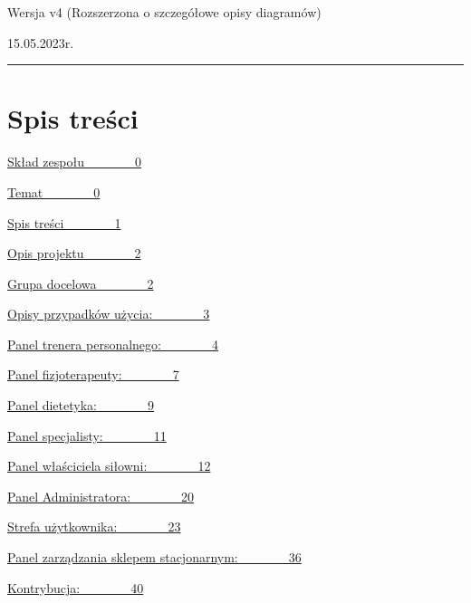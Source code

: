 \documentclass[
]{article}
\begin{document}
{}

{Wersja v4 }{(Rozszerzona o szczegółowe opisy diagramów)}

{15.05.2023r.}

\begin{center}\rule{0.5\linewidth}{0.5pt}\end{center}

{}

\hypertarget{h.qo1cey2rbfn5}{%
\section{\texorpdfstring{{Spis
treści}}{Spis treści}}\label{h.qo1cey2rbfn5}}

{\protect\hyperlink{h.ysiao1c7cfkz}{Skład zespołu~~~~~~~~0}}

{\protect\hyperlink{h.9f1f1ugzo2hd}{Temat~~~~~~~~0}}

{\protect\hyperlink{h.qo1cey2rbfn5}{Spis treści~~~~~~~~1}}

{\protect\hyperlink{h.kiazpbhrern3}{Opis projektu~~~~~~~~2}}

{\protect\hyperlink{h.no1j4fdk62eq}{Grupa docelowa~~~~~~~~2}}

{\protect\hyperlink{h.oj1ynmpx01z3}{Opisy przypadków użycia:~~~~~~~~3}}

{\protect\hyperlink{h.9umzk2qmsz4g}{Panel trenera
personalnego:~~~~~~~~4}}

{\protect\hyperlink{h.hgrtio46fsci}{Panel fizjoterapeuty:~~~~~~~~7}}

{\protect\hyperlink{h.ks35fdzbeyq3}{Panel dietetyka:~~~~~~~~9}}

{\protect\hyperlink{h.8of6ai7v3sbh}{Panel specjalisty:~~~~~~~~11}}

{\protect\hyperlink{h.2ol8m2kl4itm}{Panel właściciela
siłowni:~~~~~~~~12}}

{\protect\hyperlink{h.sjnlhh288rjz}{Panel Administratora:~~~~~~~~20}}

{\protect\hyperlink{h.53mnna977pi7}{Strefa użytkownika:~~~~~~~~23}}

{\protect\hyperlink{h.q7tyc5bsqba0}{Panel zarządzania sklepem
stacjonarnym:~~~~~~~~36}}

{\protect\hyperlink{h.3q9pme6aem79}{Kontrybucja:~~~~~~~~40}}

\hypertarget{h.ymaxm6g8s0pv}{%
\section{\texorpdfstring{{}}{}}\label{h.ymaxm6g8s0pv}}
\end{document}
